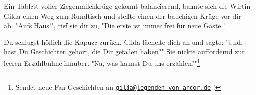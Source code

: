 Ein Tablett voller Ziegenmilchkrüge gekonnt balancierend, bahnte sich die Wirtin Gilda einen Weg zum Rundtisch und stellte einen der bauchigen Krüge vor dir ab. "Aufs Haus!", rief sie dir zu, "Die erste ist immer frei für neue Gäste."

Du schlugst höflich die Kapuze zurück. Gilda lächelte dich an und sagte: "Und, hast Du Geschichten gehört, die Dir gefallen haben?" Sie nickte auffordernd zur leeren Erzählbühne hinüber. "Na, was kannst Du uns erzählen?"\footnote{Sendet neue Fan-Geschichten an \href{mailto:gilda@legenden-von-andor.de}{\texttt{gilda@legenden-von-andor.de}} !}

